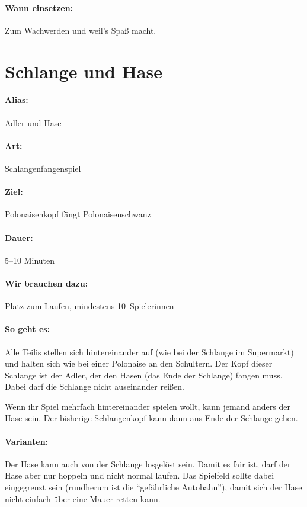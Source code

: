 \paragraph{Wann einsetzen:} Zum Wachwerden und weil's Spaß macht.

\section{Schlange und Hase}
\paragraph{Alias:} Adler und Hase
\paragraph{Art:} Schlangenfangenspiel
\paragraph{Ziel:} Polonaisenkopf fängt Polonaisenschwanz
\paragraph{Dauer:} 5--10 Minuten
\paragraph{Wir brauchen dazu:} Platz zum Laufen, mindestens 10~Spielerinnen
\paragraph{So geht es:} Alle Teilis stellen sich hintereinander auf (wie bei der Schlange im Supermarkt) und halten sich wie bei einer Polonaise an den Schultern. Der Kopf dieser Schlange ist der Adler, der den Hasen (das Ende der Schlange) fangen muss. Dabei darf die Schlange nicht auseinander reißen.

Wenn ihr Spiel mehrfach hintereinander spielen wollt, kann jemand anders der Hase sein. Der bisherige Schlangenkopf kann dann ans Ende der Schlange gehen.
\paragraph{Varianten:} Der Hase kann auch von der Schlange losgelöst sein. Damit es fair ist, darf der Hase aber nur hoppeln und nicht normal laufen. Das Spielfeld sollte dabei eingegrenzt sein (rundherum ist die "`gefährliche Autobahn"'), damit sich der Hase nicht einfach über eine Mauer retten kann.
